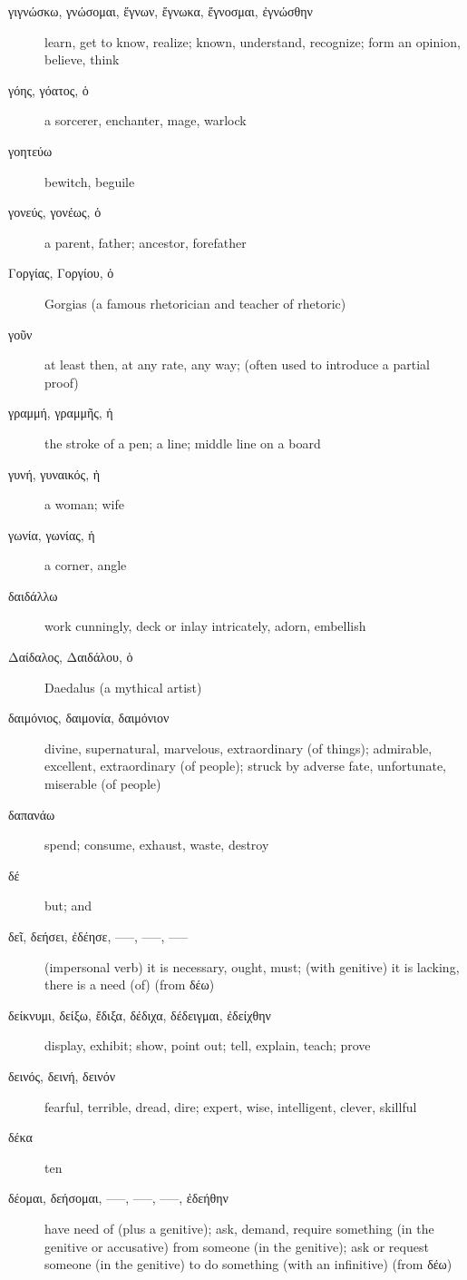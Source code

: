\documentclass[12pt,letterpaper]{article}
\begin{document}
\begin{description}
    \item[\textgreek{γιγνώσκω, γνώσομαι, ἔγνων, ἔγνωκα, ἔγνοσμαι, ἐγνώσθην}] \marginnote{*}learn, get to know, realize; known, understand, recognize; form an opinion, believe, think
    \item[\textgreek{γόης, γόατος, ὁ}] a sorcerer, enchanter, mage, warlock
    \item[\textgreek{γοητεύω}] bewitch, beguile
    \item[\textgreek{γονεύς, γονέως, ὁ}] a parent, father; ancestor, forefather
    \item[\textgreek{Γοργίας, Γοργίου, ὁ}] Gorgias (a famous rhetorician and teacher of rhetoric)
    \item[\textgreek{γοῦν}] at least then, at any rate, any way; (often used to introduce a partial proof)
    \item[\textgreek{γραμμή, γραμμῆς, ἡ}] the stroke of a pen; a line; middle line on a board
    \item[\textgreek{γυνή, γυναικός, ἡ}] \marginnote{*}a woman; wife
    \item[\textgreek{γωνία, γωνίας, ἡ}] a corner, angle
    \item[\textgreek{δαιδάλλω}] work cunningly, deck or inlay intricately, adorn, embellish
    \item[\textgreek{Δαίδαλος, Δαιδάλου, ὁ}] Daedalus (a mythical artist)
    \item[\textgreek{δαιμόνιος, δαιμονία, δαιμόνιον}] divine, supernatural, marvelous, extraordinary (of things); admirable, excellent, extraordinary (of people); struck by adverse fate, unfortunate, miserable (of people)
    \item[\textgreek{δαπανάω}] spend; consume, exhaust, waste, destroy
    \item[\textgreek{δέ}] \marginnote{*}but; and
    \item[\textgreek{δεῖ, δεήσει, ἐδέησε, –––, –––, –––}] \marginnote{*}(impersonal verb) it is necessary, ought, must; (with genitive) it is lacking, there is a need (of) (from \textgreek{δέω})
    \item[\textgreek{δείκνυμι, δείξω, ἔδιξα, δέδιχα, δέδειγμαι, ἐδείχθην}] \marginnote{*}display, exhibit; show, point out; tell, explain, teach; prove
    \item[\textgreek{δεινός, δεινή, δεινόν}] \marginnote{*}fearful, terrible, dread, dire; expert, wise, intelligent, clever, skillful
    \item[\textgreek{δέκα}] \marginnote{*}ten
    \item[\textgreek{δέομαι, δεήσομαι, –––, –––, –––, ἐδεήθην}] have need of (plus a genitive); ask, demand, require something (in the genitive or accusative) from someone (in the genitive); ask or request someone (in the genitive) to do something (with an infinitive) (from \textgreek{δέω})

\end{description}
\end{document}
